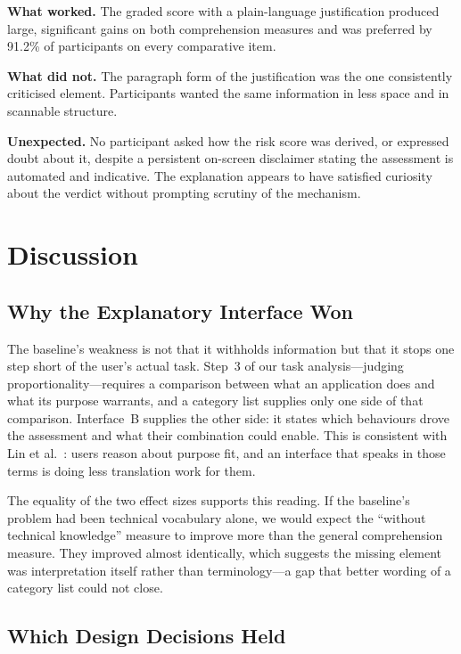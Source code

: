 \documentclass[sigconf]{acmart}
\begin{document}
\textbf{What worked.} The graded score with a plain-language justification
produced large, significant gains on both comprehension measures and was
preferred by 91.2\% of participants on every comparative item.

\textbf{What did not.} The paragraph form of the justification was the one
consistently criticised element. Participants wanted the same information
in less space and in scannable structure.

\textbf{Unexpected.} No participant asked how the risk score was derived,
or expressed doubt about it, despite a persistent on-screen disclaimer
stating the assessment is automated and indicative. The explanation appears
to have satisfied curiosity about the verdict without prompting scrutiny of
the mechanism.

\section{Discussion}

\subsection{Why the Explanatory Interface Won}

The baseline's weakness is not that it withholds information but that it
stops one step short of the user's actual task. Step~3 of our task
analysis---judging proportionality---requires a comparison between what an
application does and what its purpose warrants, and a category list
supplies only one side of that comparison. Interface~B supplies the other
side: it states which behaviours drove the assessment and what their
combination could enable. This is consistent with Lin et
al.~\cite{lin2012expectation}: users reason about purpose fit, and an
interface that speaks in those terms is doing less translation work for
them.

The equality of the two effect sizes supports this reading. If the
baseline's problem had been technical vocabulary alone, we would expect the
``without technical knowledge'' measure to improve more than the general
comprehension measure. They improved almost identically, which suggests the
missing element was interpretation itself rather than terminology---a gap
that better wording of a category list could not close.

\subsection{Which Design Decisions Held}
\end{document}
